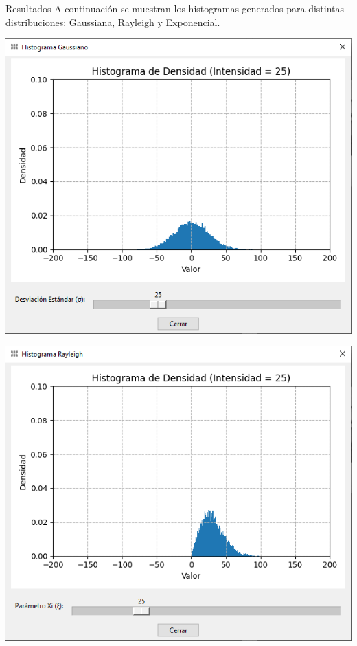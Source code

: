 \documentclass{beamer}
\begin{document}
\begin{frame}[fragile]{Resultados}
	\justifying
	A continuación se muestran los histogramas generados para distintas distribuciones: 
	Gaussiana, Rayleigh y Exponencial.
	\vspace{0.3cm}
	
	\centering
	\begin{minipage}{0.32\linewidth}
		\centering
		\includegraphics[width=\linewidth]{../results/dist_gauss}
	\end{minipage}\hfill
	\begin{minipage}{0.32\linewidth}
		\centering
		\includegraphics[width=\linewidth]{../results/dist_rayleigh}

\end{minipage}
\end{frame}
\end{document}
